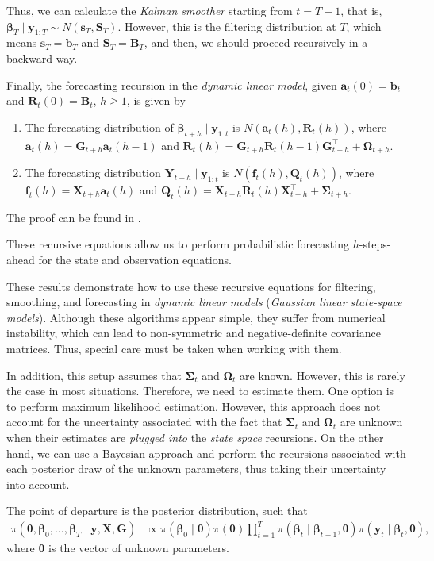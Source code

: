 Thus, we can calculate the \textit{Kalman smoother} starting from $t=T-1$, that is, $\bm{\beta}_{T}\mid \bm{y}_{1:T}\sim N(\bm{s}_{T},\bm{S}_{T})$. However, this is the filtering distribution at $T$, which means $\bm{s}_{T}=\bm{b}_{T}$ and $\bm{S}_{T}=\bm{B}_{T}$, and then, we should proceed recursively in a backward way.

Finally, the forecasting recursion in the \textit{dynamic linear model}, given $\bm{a}_t(0)=\bm{b}_t$ and $\bm{R}_t(0)=\bm{B}_t$, $h\geq 1$, is given by 
\begin{enumerate}
	\item The forecasting distribution of $\bm{\beta}_{t+h}\mid \bm{y}_{1:t}$ is $N(\bm{a}_t(h),\bm{R}_t(h))$, where $\bm{a}_t(h)=\bm{G}_{t+h}\bm{a}_{t}(h-1)$ and $\bm{R}_t(h)=\bm{G}_{t+h}\bm{R}_t(h-1)\bm{G}_{t+h}^{\top}+\bm{\Omega}_{t+h}$.
	\item The forecasting distribution $\bm{Y}_{t+h}\mid \bm{y}_{1:t}$ is $N(\bm{f}_t(h),\bm{Q}_t(h))$, where $\bm{f}_t(h)=\bm{X}_{t+h}\bm{a}_t(h)$ and $\bm{Q}_t(h)=\bm{X}_{t+h}\bm{R}_t(h)\bm{X}_{t+h}^{\top}+\bm{\Sigma}_{t+h}$.  
\end{enumerate}
The proof can be found in \cite[Chap~2]{petris2009dynamic}.

These recursive equations allow us to perform probabilistic forecasting $h$-steps-ahead for the state and observation equations.

These results demonstrate how to use these recursive equations for filtering, smoothing, and forecasting in \textit{dynamic linear models} (\textit{Gaussian linear state-space models}). Although these algorithms appear simple, they suffer from numerical instability, which can lead to non-symmetric and negative-definite covariance matrices. Thus, special care must be taken when working with them.

In addition, this setup assumes that $\bm{\Sigma}_t$ and $\bm{\Omega}_t$ are known. However, this is rarely the case in most situations. Therefore, we need to estimate them. One option is to perform maximum likelihood estimation. However, this approach does not account for the uncertainty associated with the fact that $\bm{\Sigma}_t$ and $\bm{\Omega}_t$ are unknown when their estimates are \textit{plugged into} the \textit{state space} recursions. On the other hand, we can use a Bayesian approach and perform the recursions associated with each posterior draw of the unknown parameters, thus taking their uncertainty into account.

The point of departure is the posterior distribution, such that
\begin{align*}
	\pi(\bm{\theta},\bm{\beta}_0,\dots,\bm{\beta}_T\mid \bm{y}, \bm{X}, \bm{G})&\propto\pi(\bm{\beta}_0\mid \bm{\theta})\pi(\bm{\theta})\prod_{t=1}^{T}\pi(\bm{\beta}_t\mid \bm{\beta}_{t-1},\bm{\theta})\pi(\bm{y}_t\mid \bm{\beta}_t,\bm{\theta}),
\end{align*} 
where $\bm{\theta}$ is the vector of unknown parameters.

